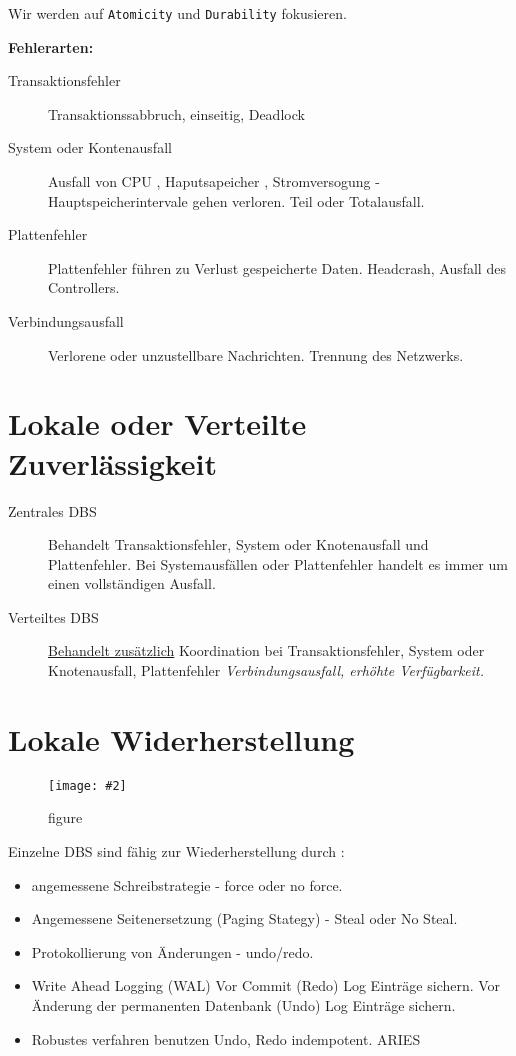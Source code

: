 \documentclass[a4paper,10pt,titlepage=false]{scrreprt}
\newcommand{\pic}[2][figure]{\begin{figure}[h]
 \centering
 \texttt{[image: \#2]}
 \caption{#1}
\end{figure}
}
\begin{document}
Wir werden auf \texttt{Atomicity} und \texttt{Durability} fokusieren.

\textbf{Fehlerarten:}
\begin{description}
  \item[Transaktionsfehler] Transaktionssabbruch, einseitig, Deadlock
  \item[System oder Kontenausfall] Ausfall von CPU , Haputsapeicher , Stromversogung - Hauptspeicherintervale gehen verloren. Teil oder Totalausfall.
  \item[Plattenfehler] Plattenfehler führen zu Verlust gespeicherte Daten. Headcrash, Ausfall des Controllers.
  \item[Verbindungsausfall] Verlorene oder unzustellbare Nachrichten. Trennung des Netzwerks.
\end{description}

\section{Lokale oder Verteilte Zuverlässigkeit} %
\label{sec:lokale_oder_verteilte_zuverl_ssigkeit}

\begin{description}
  \item[Zentrales DBS] Behandelt Transaktionsfehler, System oder Knotenausfall und Plattenfehler. Bei Systemausfällen oder Plattenfehler handelt es immer um einen vollständigen Ausfall.
  \item[Verteiltes DBS] \underline{Behandelt zusätzlich} Koordination bei Transaktionsfehler, System oder Knotenausfall, Plattenfehler \textit{Verbindungsausfall, erhöhte Verfügbarkeit.} 
\end{description}

\section{Lokale Widerherstellung} %
\label{sec:lokale_widerherstellung}
\pic{lres.png}
Einzelne DBS sind fähig zur Wiederherstellung durch :
\begin{itemize}
  \item angemessene Schreibstrategie - force oder no force.
  \item Angemessene Seitenersetzung (Paging Stategy) - Steal oder No Steal.
  \item Protokollierung von Änderungen - undo/redo.
  \item Write Ahead Logging (WAL) 
  \subitem Vor Commit (Redo) Log Einträge sichern.
  \subitem Vor Änderung der permanenten Datenbank (Undo) Log Einträge sichern.
  \item Robustes verfahren benutzen
  \subitem Undo, Redo indempotent.
  \subitem ARIES
\end{itemize}
\end{document}
